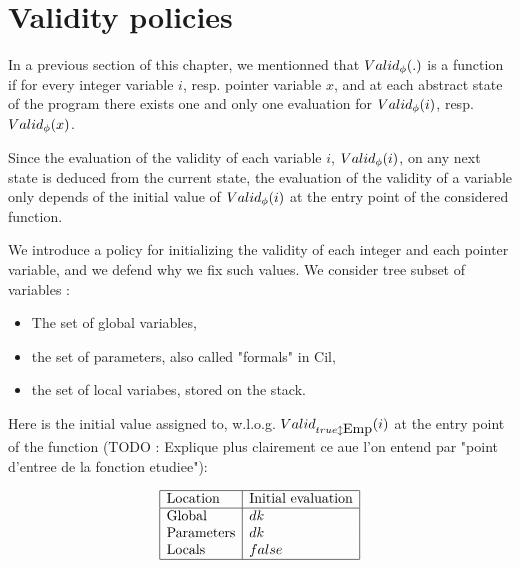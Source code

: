 \section{Validity policies}

In a previous section of this chapter, we mentionned that $Valid_{\phi}(.)$ 
is a function if for every integer variable $i$, resp. pointer variable
$x$, and at each abstract state of the program there exists one and only one evaluation for $Valid_{\phi}(i)$, resp. $Valid_{\phi}(x)$.

Since the evaluation of the validity of each variable $i$, $Valid_{\phi}(i)$, 
on any next state is deduced from the current state, the evaluation of
the validity of a variable only depends of the initial value of $Valid_{\phi}(i)$
at the entry point of the considered function.

We introduce a policy for initializing the validity of each integer and each
pointer variable, and we defend why we fix such values.
We consider tree subset of variables :

\begin{itemize}
\item The set of global variables,
\item the set of parameters, also called "formals" in Cil,
\item the set of local variabes, stored on the stack.
\end{itemize}

Here is the initial value assigned to, w.l.o.g. $\isvalid{\Formula{\true}{\Emp}}{i}$ at the entry point of the function (TODO : Explique plus clairement ce
aue l'on entend par "point d'entree de la fonction etudiee"):

$$
\begin{array}{|l|l|}
\hline
\mbox{Location} & \mbox{Initial evaluation} \\
\hline
\mbox{Global}& dk \\
\mbox{Parameters} & dk \\
\mbox{Locals} & false \\
\hline
\end{array}
$$
